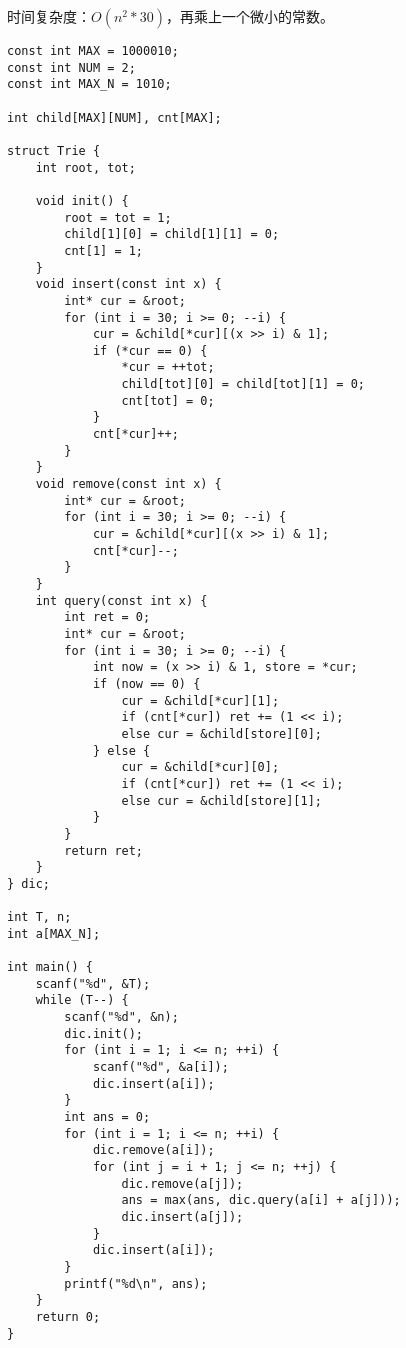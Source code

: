 时间复杂度：$O(n^2 * 30)$，再乘上一个微小的常数。
\begin{lstlisting}
const int MAX = 1000010;
const int NUM = 2;
const int MAX_N = 1010;

int child[MAX][NUM], cnt[MAX];

struct Trie {
    int root, tot;

    void init() {
        root = tot = 1;
        child[1][0] = child[1][1] = 0;
        cnt[1] = 1;
    }
    void insert(const int x) {
        int* cur = &root;
        for (int i = 30; i >= 0; --i) {
            cur = &child[*cur][(x >> i) & 1];
            if (*cur == 0) {
                *cur = ++tot;
                child[tot][0] = child[tot][1] = 0;
                cnt[tot] = 0;
            }
            cnt[*cur]++;
        }
    }
    void remove(const int x) {
        int* cur = &root;
        for (int i = 30; i >= 0; --i) {
            cur = &child[*cur][(x >> i) & 1];
            cnt[*cur]--;
        }
    }
    int query(const int x) {
        int ret = 0;
        int* cur = &root;
        for (int i = 30; i >= 0; --i) {
            int now = (x >> i) & 1, store = *cur;
            if (now == 0) {
                cur = &child[*cur][1];
                if (cnt[*cur]) ret += (1 << i);
                else cur = &child[store][0];
            } else {
                cur = &child[*cur][0];
                if (cnt[*cur]) ret += (1 << i);
                else cur = &child[store][1];
            }
        }
        return ret;
    }
} dic;

int T, n;
int a[MAX_N];

int main() {
    scanf("%d", &T);
    while (T--) {
        scanf("%d", &n);
        dic.init();
        for (int i = 1; i <= n; ++i) {
            scanf("%d", &a[i]);
            dic.insert(a[i]);
        }
        int ans = 0;
        for (int i = 1; i <= n; ++i) {
            dic.remove(a[i]);
            for (int j = i + 1; j <= n; ++j) {
                dic.remove(a[j]);
                ans = max(ans, dic.query(a[i] + a[j]));
                dic.insert(a[j]);
            }
            dic.insert(a[i]);
        }
        printf("%d\n", ans);
    }
    return 0;
}
\end{lstlisting}

%
